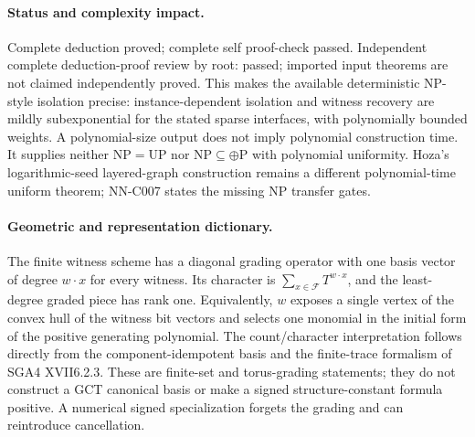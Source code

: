 \paragraph{Status and complexity impact.}
Complete deduction proved; complete self proof-check passed. Independent complete deduction-proof review by root: passed; imported input theorems are not claimed independently proved. This makes the available deterministic NP-style isolation precise: instance-dependent isolation and witness recovery are mildly subexponential for the stated sparse interfaces, with polynomially bounded weights. A polynomial-size output does not imply polynomial construction time. It supplies neither $\mathrm{NP}=\mathrm{UP}$ nor $\mathrm{NP}\subseteq\oplus\mathrm P$ with polynomial uniformity. Hoza's logarithmic-seed layered-graph construction remains a different polynomial-time uniform theorem; NN-C007 states the missing NP transfer gates.

\paragraph{Geometric and representation dictionary.}
The finite witness scheme has a diagonal grading operator with one basis vector of degree $w\cdot x$ for every witness. Its character is $\sum_{x\in\mathcal F}T^{w\cdot x}$, and the least-degree graded piece has rank one. Equivalently, $w$ exposes a single vertex of the convex hull of the witness bit vectors and selects one monomial in the initial form of the positive generating polynomial. The count/character interpretation follows directly from the component-idempotent basis and the finite-trace formalism of SGA4 XVII6.2.3. These are finite-set and torus-grading statements; they do not construct a GCT canonical basis or make a signed structure-constant formula positive. A numerical signed specialization forgets the grading and can reintroduce cancellation.



